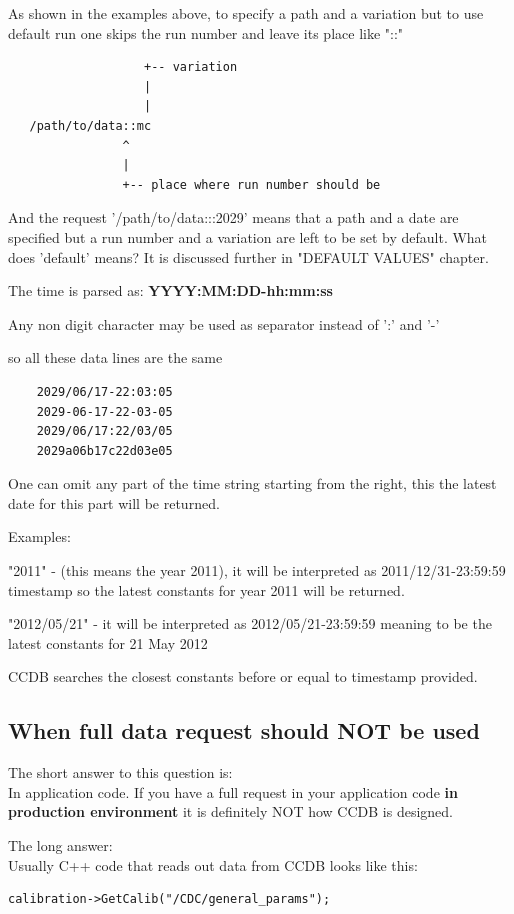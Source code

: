 \documentclass{article}
\begin{document}
As shown in the examples above, to specify a path and a variation but
to use default run one skips the run number and leave its place like "::"
\begin{verbatim}
                   +-- variation
                   |
                   |
   /path/to/data::mc
                ^
                |
                +-- place where run number should be
\end{verbatim}


And the request '/path/to/data:::2029' means that a path and a date are specified
but a run number and a variation are left to be set by default.
What does 'default' means? It is discussed further in "DEFAULT VALUES" chapter.

The time is parsed as:
    \textbf{YYYY:MM:DD-hh:mm:ss}

Any non digit character may be used as separator instead of ':' and '-'

so all these data lines are the same
\begin{verbatim}
    2029/06/17-22:03:05
    2029-06-17-22-03-05
    2029/06/17:22/03/05
    2029a06b17c22d03e05
\end{verbatim}

One can omit any part of the time string starting from the right, this the 
latest date for this part will be returned.

Examples:

"2011" - (this means the year 2011), it will be interpreted as
2011/12/31-23:59:59 timestamp so the latest constants for year
2011 will be returned.


"2012/05/21" - it will be interpreted as 2012/05/21-23:59:59 meaning to be the
latest constants for 21 May 2012

CCDB searches the closest constants before or equal to timestamp provided.

%
\subsection{When full data request should NOT be used}

The short answer to this question is: \\
In application code. If you have a full request in your application code \textbf{in production environment} it is definitely NOT how CCDB is designed. 

The long answer:\\
Usually C++ code that reads out data from CCDB looks like this:
\begin{verbatim}
calibration->GetCalib("/CDC/general_params");
\end{verbatim}
\end{document}
